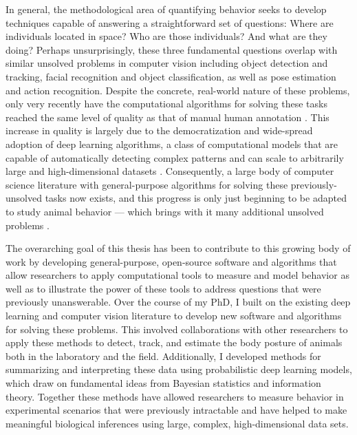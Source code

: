 In general, the methodological area of quantifying behavior seeks to develop techniques capable of answering a straightforward set of questions: Where are individuals located in space? Who are those individuals? And what are they doing? Perhaps unsurprisingly, these three fundamental questions overlap with similar unsolved problems in computer vision \citep{dell2014automated, lecun2015deep} including object detection and tracking, facial recognition and object classification, as well as pose estimation and action recognition. Despite the concrete, real-world nature of these problems, only very recently have the computational algorithms for solving these tasks reached the same level of quality as that of manual human annotation \citep{lecun2015deep, goodfellow2016deep}. This increase in quality is largely due to the democratization and wide-spread adoption of deep learning algorithms, a class of computational models that are capable of automatically detecting complex patterns and can scale to arbitrarily large and high-dimensional datasets \citep{lecun2015deep, goodfellow2016deep}. Consequently, a large body of computer science literature with general-purpose algorithms for solving these previously-unsolved tasks now exists, and this progress is only just beginning to be adapted to study animal behavior \citep{mathis2018deeplabcut, pereira2019fast, graving2019deepposekit, gunel2019deepfly3d} --- which brings with it many additional unsolved problems \citep{graving2019deepposekit, mathis2020deep, mathis2020primer}.

The overarching goal of this thesis has been to contribute to this growing body of work by developing general-purpose, open-source software and algorithms that allow researchers to apply computational tools to measure and model behavior as well as to illustrate the power of these tools to address questions that were previously unanswerable. Over the course of my PhD, I built on the existing deep learning and computer vision literature to develop new software and algorithms for solving these problems. This involved collaborations with other researchers to apply these methods to detect, track, and estimate the body posture of animals both in the laboratory and the field. Additionally, I developed methods for summarizing and interpreting these data using probabilistic deep learning models, which draw on fundamental ideas from Bayesian statistics and information theory. Together these methods have allowed researchers to measure behavior in experimental scenarios that were previously intractable and have helped to make meaningful biological inferences using large, complex, high-dimensional data sets.

